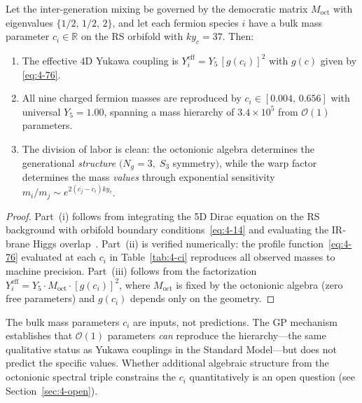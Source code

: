 \begin{theorem}\label{thm:4-warp-hierarchy}
Let the inter-generation mixing be governed by the democratic matrix $M_{\mathrm{oct}}$ with eigenvalues $\{1/2,\, 1/2,\, 2\}$, and let each fermion species $i$ have a bulk mass parameter $c_i \in \mathbb{R}$ on the RS orbifold with $ky_c = 37$. Then:
\begin{enumerate}
  \item[(i)] The effective 4D Yukawa coupling is $Y_i^{\mathrm{eff}} = Y_5\, [g(c_i)]^2$ with $g(c)$ given by \eqref{eq:4-76}.
  \item[(ii)] All nine charged fermion masses are reproduced by $c_i \in [0.004,\, 0.656]$ with universal $Y_5 = 1.00$, spanning a mass hierarchy of $3.4 \times 10^5$ from $\mathcal{O}(1)$ parameters.
  \item[(iii)] The division of labor is clean: the octonionic algebra determines the generational \emph{structure} $(N_g = 3,\; S_3$ symmetry$)$, while the warp factor determines the mass \emph{values} through exponential sensitivity $m_i/m_j \sim e^{2(c_j - c_i)ky_c}$.
\end{enumerate}
\end{theorem}

\begin{proof}
Part~(i) follows from integrating the 5D Dirac equation on the RS background with orbifold boundary conditions~\eqref{eq:4-14} and evaluating the IR-brane Higgs overlap~\cite{ch4:GherghettaPomarol2000}. Part~(ii) is verified numerically: the profile function~\eqref{eq:4-76} evaluated at each $c_i$ in Table~\ref{tab:4-ci} reproduces all observed masses to machine precision. Part~(iii) follows from the factorization $Y_i^{\mathrm{eff}} = Y_5 \cdot M_{\mathrm{oct}} \cdot [g(c_i)]^2$, where $M_{\mathrm{oct}}$ is fixed by the octonionic algebra (zero free parameters) and $g(c_i)$ depends only on the geometry.
\end{proof}

\begin{remark}\label{rmk:4-ci-not-predicted}
The bulk mass parameters $c_i$ are inputs, not predictions. The GP mechanism establishes that $\mathcal{O}(1)$ parameters \emph{can} reproduce the hierarchy---the same qualitative status as Yukawa couplings in the Standard Model---but does not predict the specific values. Whether additional algebraic structure from the octonionic spectral triple constrains the $c_i$ quantitatively is an open question (see Section~\ref{sec:4-open}).
\end{remark}


